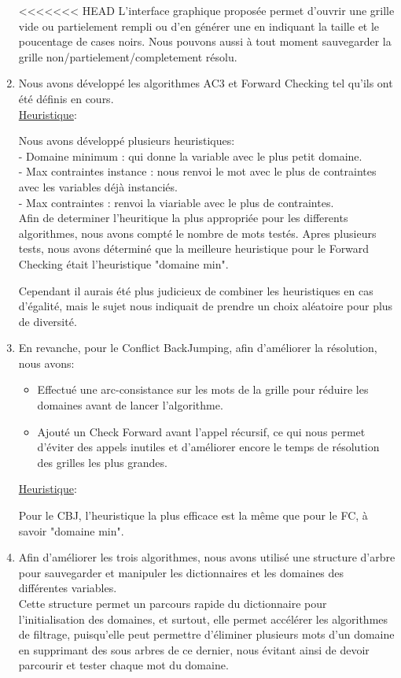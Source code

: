 \documentclass[a4paper,12pt]{report}
\begin{document}
\begin{enumerate}
<<<<<<< HEAD
L'interface graphique proposée permet d'ouvrir une grille vide ou partielement rempli ou d'en générer une en indiquant la taille et le poucentage de cases noirs. Nous pouvons aussi à tout moment sauvegarder la grille non/partielement/completement résolu. \\

\item Nous avons développé les algorithmes AC3 et Forward Checking tel qu'ils ont été définis en cours. \\

\ul{Heuristique}:

Nous avons développé plusieurs heuristiques:\\
 - Domaine minimum : qui donne la variable avec le plus petit domaine.\\
 - Max contraintes instance : nous renvoi le mot avec le plus de contraintes avec les variables déjà instanciés.\\
 - Max contraintes : renvoi la viariable avec le plus de contraintes.\\
 
Afin de determiner l'heuritique la plus appropriée pour les differents algorithmes, nous avons compté le nombre de mots testés.
Apres plusieurs tests, nous avons déterminé que la meilleure heuristique pour le Forward Checking était l'heuristique "domaine min". 

Cependant il aurais été plus judicieux de combiner les heuristiques en cas d'égalité, mais le sujet nous indiquait de prendre un choix aléatoire pour plus de diversité.\\

\item En revanche, pour le Conflict BackJumping, afin d’améliorer la résolution, nous avons:
\begin{itemize}
\item Effectué une arc-consistance sur les mots de la grille pour réduire les domaines avant de lancer l'algorithme.
\item Ajouté un Check Forward avant l'appel récursif, ce qui nous permet d'éviter des appels inutiles et d'améliorer encore le temps de résolution des grilles les plus grandes.\\
\end{itemize}

\ul{Heuristique}:

Pour le CBJ, l'heuristique la plus efficace est la même que pour le FC, à savoir "domaine min".\\

\item Afin d'améliorer les trois algorithmes, nous avons utilisé une structure d'arbre pour sauvegarder et manipuler les dictionnaires et les domaines des différentes variables.\\
 Cette structure permet un parcours rapide du dictionnaire pour l'initialisation des domaines, et surtout, elle permet accélérer les algorithmes de filtrage, puisqu'elle peut permettre d'éliminer plusieurs mots d'un domaine en supprimant des sous arbres de ce dernier, nous évitant ainsi de devoir parcourir et tester chaque mot du domaine.\\
\end{enumerate}
\end{document}
